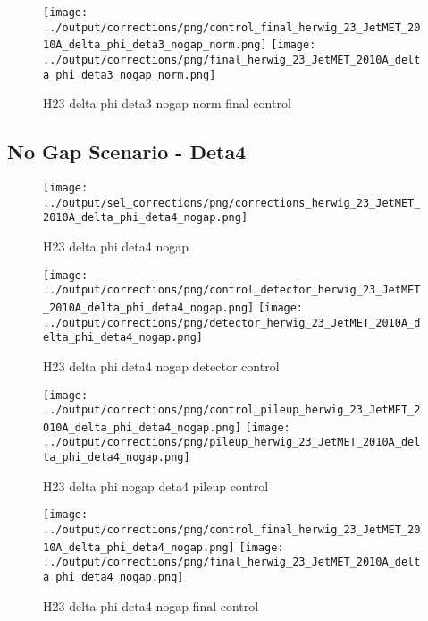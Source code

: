 \documentclass[11pt]{book}
\begin{document}
\begin{figure}[ht]
\centering
\texttt{[image: ../output/corrections/png/control\_final\_herwig\_23\_JetMET\_2010A\_delta\_phi\_deta3\_nogap\_norm.png]}
\texttt{[image: ../output/corrections/png/final\_herwig\_23\_JetMET\_2010A\_delta\_phi\_deta3\_nogap\_norm.png]}
\caption{H23 delta phi deta3 nogap norm final control}
\label{fig:H23_JetMET_2010A_delta_phi_deta3_nogap_norm_final_control}
\end{figure}




\clearpage
\subsection{No Gap Scenario - Deta4}

\begin{figure}[ht]
\centering
\texttt{[image: ../output/sel\_corrections/png/corrections\_herwig\_23\_JetMET\_2010A\_delta\_phi\_deta4\_nogap.png]}
\caption{H23 delta phi deta4 nogap}
\label{fig:H23_JetMET_2010A_delta_phi_deta4_nogap}
\end{figure}

\begin{figure}[ht]
\centering
\texttt{[image: ../output/corrections/png/control\_detector\_herwig\_23\_JetMET\_2010A\_delta\_phi\_deta4\_nogap.png]}
\texttt{[image: ../output/corrections/png/detector\_herwig\_23\_JetMET\_2010A\_delta\_phi\_deta4\_nogap.png]}
\caption{H23 delta phi deta4 nogap detector control}
\label{fig:H23_JetMET_2010A_delta_phi_deta4_nogap_detector_control}
\end{figure}

\begin{figure}[ht]
\centering
\texttt{[image: ../output/corrections/png/control\_pileup\_herwig\_23\_JetMET\_2010A\_delta\_phi\_deta4\_nogap.png]}
\texttt{[image: ../output/corrections/png/pileup\_herwig\_23\_JetMET\_2010A\_delta\_phi\_deta4\_nogap.png]}
\caption{H23 delta phi nogap deta4 pileup control}
\label{fig:H23_JetMET_2010A_delta_phi_deta4_nogap_pileup_control}
\end{figure}


\begin{figure}[ht]
\centering
\texttt{[image: ../output/corrections/png/control\_final\_herwig\_23\_JetMET\_2010A\_delta\_phi\_deta4\_nogap.png]}
\texttt{[image: ../output/corrections/png/final\_herwig\_23\_JetMET\_2010A\_delta\_phi\_deta4\_nogap.png]}
\caption{H23 delta phi deta4 nogap final control}
\label{fig:H23_JetMET_2010A_delta_phi_deta4_nogap_final_control}
\end{figure}
\end{document}
